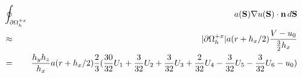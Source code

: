 \documentclass[10pt]{article}
\begin{document}
\begin{minipage}{1.75in}
\end{minipage} \ \ \ \ 
\begin{minipage}{4.00in}
\begin{eqnarray*}
 & \oint_{\partial\Omega_h^{+x}} \!\!\! & a(\textbf{S}) \nabla u(\textbf{S})\cdot \textbf{n} \, d\textbf{S}  \\
 & \approx & |\partial\Omega_h^{+x}| a(r+h_x/2) \frac{V - u_0}{\frac{3}{2}h_x} \\
& = & \frac{h_yh_z}{h_x}  a(r+h_x/2) \frac{2}{3} (\frac{30}{32} U_1 + \frac{3}{32} U_2 + \frac{3}{32} U_3 + \frac{2}{32}U_4 - \frac{3}{32}U_5 - \frac{3}{32}U_6 - u_0)   \\
\end{eqnarray*}
\end{minipage}





% 
\end{document}
